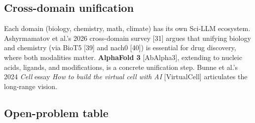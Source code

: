 \subsection{Cross-domain unification}\label{cross-domain-unification}

Each domain (biology, chemistry, math, climate) has its own Sci-LLM ecosystem. Ashyrmamatov et al.'s 2026 cross-domain survey {[}31{]} argues that unifying biology and chemistry (via BioT5 {[}39{]} and nach0 {[}40{]}) is essential for drug discovery, where both modalities matter. \textbf{AlphaFold 3} {[}AbAlpha3{]}, extending to nucleic acids, ligands, and modifications, is a concrete unification step. Bunne et al.'s 2024 \emph{Cell} essay \emph{How to build the virtual cell with AI} {[}VirtualCell{]} articulates the long-range vision.

\subsection{Open-problem table}\label{open-problem-table}


